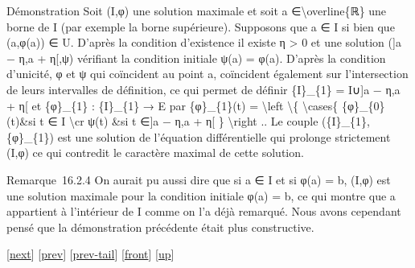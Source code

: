\documentclass[]{article}
\begin{document}
Démonstration Soit (I,φ) une solution maximale et soit a
∈\textbackslash{}overline\{ℝ\} une borne de I (par exemple la borne
supérieure). Supposons que a ∈ I si bien que (a,φ(a)) ∈ U. D'après la
condition d'existence il existe η \textgreater{} 0 et une solution ({]}a
− η,a + η{[},ψ) vérifiant la condition initiale ψ(a) = φ(a). D'après la
condition d'unicité, φ et ψ qui coïncident au point a, coïncident
également sur l'intersection de leurs intervalles de définition, ce qui
permet de définir \{I\}\_\{1\} = I∪{]}a − η,a + η{[} et \{φ\}\_\{1\} :
\{I\}\_\{1\} → E par \{φ\}\_\{1\}(t) = \textbackslash{}left
\textbackslash{}\{ \textbackslash{}cases\{ \{φ\}\_\{0\}(t)\&si t ∈ I
\textbackslash{}cr ψ(t) \&si t ∈{]}a − η,a + η{[} \}
\textbackslash{}right .. Le couple (\{I\}\_\{1\},\{φ\}\_\{1\}) est une
solution de l'équation différentielle qui prolonge strictement (I,φ) ce
qui contredit le caractère maximal de cette solution.

Remarque~16.2.4 On aurait pu aussi dire que si a ∈ I et si φ(a) = b,
(I,φ) est une solution maximale pour la condition initiale φ(a) = b, ce
qui montre que a appartient à l'intérieur de I comme on l'a déjà
remarqué. Nous avons cependant pensé que la démonstration précédente
était plus constructive.

{[}\href{coursse88.html}{next}{]} {[}\href{coursse86.html}{prev}{]}
{[}\href{coursse86.html\#tailcoursse86.html}{prev-tail}{]}
{[}\href{coursse87.html}{front}{]}
{[}\href{coursch17.html\#coursse87.html}{up}{]}
\end{document}
